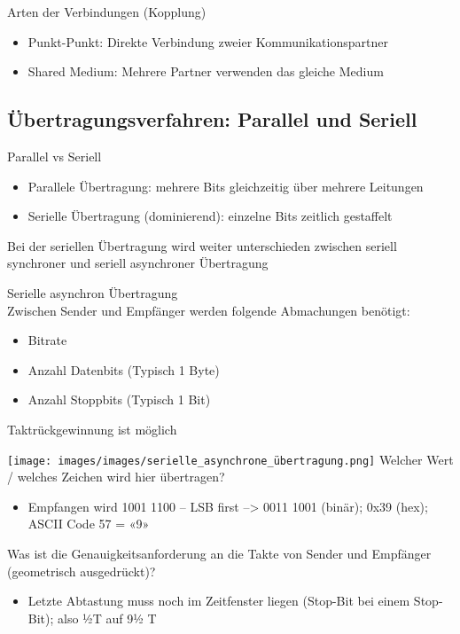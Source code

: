 \begin{concept}{Arten der Verbindungen (Kopplung)}
    \begin{itemize}
        \item Punkt-Punkt: Direkte Verbindung zweier Kommunikationspartner
        \item Shared Medium: Mehrere Partner verwenden das gleiche Medium
    \end{itemize}
\end{concept}

\columnbreak

\subsection{Übertragungsverfahren: Parallel und Seriell}

\begin{definition}{Parallel vs Seriell}
    \begin{itemize}
        \item Parallele Übertragung: mehrere Bits gleichzeitig über mehrere Leitungen
        \item Serielle Übertragung (dominierend): einzelne Bits zeitlich gestaffelt
    \end{itemize}
    Bei der seriellen Übertragung wird weiter unterschieden zwischen seriell synchroner und
    seriell asynchroner Übertragung
\end{definition}

\begin{definition}{Serielle asynchron Übertragung}\\
    Zwischen Sender und Empfänger werden folgende Abmachungen benötigt:
    \begin{itemize}
        \item Bitrate
        \item Anzahl Datenbits (Typisch 1 Byte)
        \item Anzahl Stoppbits (Typisch 1 Bit)
    \end{itemize}
    Taktrückgewinnung ist möglich
\end{definition}

\begin{example}
    \texttt{[image: images/images/serielle\_asynchrone\_übertragung.png]}
    Welcher Wert / welches Zeichen wird hier übertragen?
    \begin{itemize}
        \item Empfangen wird 1001 1100 – LSB first –> 0011 1001 (binär); 0x39 (hex); ASCII Code 57 = «9»
    \end{itemize}
    Was ist die Genauigkeitsanforderung an die Takte von Sender und Empfänger (geometrisch
    ausgedrückt)?
    \begin{itemize}
        \item Letzte Abtastung muss noch im Zeitfenster liegen (Stop-Bit bei einem Stop-Bit); also ½T auf 9½ T
    \end{itemize}
\end{example}

